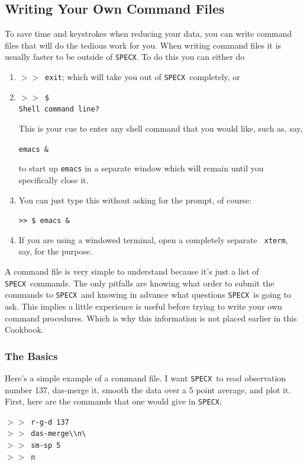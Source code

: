 \documentclass[11pt,twoside]{article}
\newcommand{\SPECX}{{\tt SPECX}}
\newcommand{\SP}{{$>\!>$}}
\begin{document}
\subsection{Writing Your Own Command Files}
\label{sec:specx_9}
To save time and keystrokes when reducing your data, you can write
command files that will do the tedious work for you.  When writing
command files it is usually faster to be outside of \SPECX . To do
this you can either do
\begin{enumerate}
\item
\SP\ \verb|exit|; which will take you out of \SPECX\ completely, or
\item
\SP\ \verb|$|\\
\verb|Shell command line?|

This is your cue to enter any shell command that you would like, such
as, say,

\verb|emacs &|

to start up {\tt emacs} in a separate window which will remain until
you specifically close it.
\item
You can just type this without asking for the prompt, of course:

\verb|>> $ emacs &|

\item
If you are using a windowed terminal, open a completely separate {\tt
xterm}, say, for the purpose.
\end{enumerate}

A command file is very simple to understand because it's just a list of
\SPECX\ commands.  The only pitfalls are knowing what order to submit the
commands to \SPECX\ and knowing in advance what questions \SPECX\ is
going to ask. This implies a little experience is useful before trying
to write your own command procedures. Which is why this information is
not placed earlier in this Cookbook.

\subsubsection{The Basics}
\label{sec:specx_9.1}
Here's a simple example of a command file.  I want \SPECX\ to read
observation number 137, das-merge it, smooth the data over a 5 point
average, and plot it.  First, here are the commands that one would
give in \SPECX :

\SP\ \verb|r-g-d 137| \\
\SP\ \verb|das-merge\\n\ | \\
\SP\ \verb|sm-sp 5| \\
\SP\ \verb|n|
\end{document}
